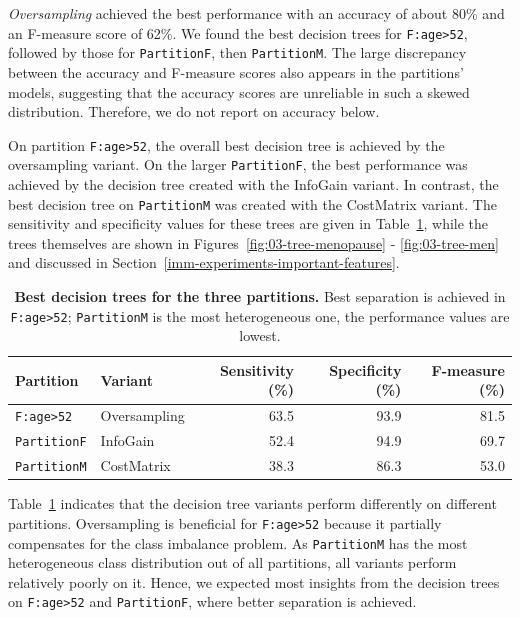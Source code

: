 \documentclass[
  oneside]{book}
\begin{document}
\emph{Oversampling} achieved the best performance with an accuracy of about 80\% and an F-measure score of 62\%.
We found the best decision trees for \texttt{F:age\textgreater{}52}, followed by those for \texttt{PartitionF}, then \texttt{PartitionM}.
The large discrepancy between the accuracy and F-measure scores also appears in the partitions' models, suggesting that the accuracy scores are unreliable in such a skewed distribution. Therefore, we do not report on accuracy below.

On partition \texttt{F:age\textgreater{}52}, the overall best decision tree is achieved by the oversampling variant.
On the larger \texttt{PartitionF}, the best performance was achieved by the decision tree created with the InfoGain variant.
In contrast, the best decision tree on \texttt{PartitionM} was created with the CostMatrix variant.
The sensitivity and specificity values for these trees are given in Table~\ref{tab:03-tree-performance-sens-spec}, while the trees themselves are shown in Figures~\ref{fig:03-tree-menopause} - \ref{fig:03-tree-men} and discussed in Section~\ref{imm-experiments-important-features}.



\begin{table}

\caption{\label{tab:03-tree-performance-sens-spec}\textbf{Best decision trees for the three partitions.} Best separation is achieved in \texttt{F:age\textgreater{}52}; \texttt{PartitionM} is the most heterogeneous one, the performance values are lowest.}
\centering
\begin{tabular}[t]{llrrr}
\toprule
\textbf{Partition} & \textbf{Variant} & \textbf{Sensitivity (\%)} & \textbf{Specificity (\%)} & \textbf{F-measure (\%)}\\
\midrule
\texttt{F:age>52} & Oversampling & 63.5 & 93.9 & 81.5\\
\texttt{PartitionF} & InfoGain & 52.4 & 94.9 & 69.7\\
\texttt{PartitionM} & CostMatrix & 38.3 & 86.3 & 53.0\\
\bottomrule
\end{tabular}
\end{table}

Table~\ref{tab:03-tree-performance-sens-spec} indicates that the decision tree variants perform differently on different partitions.
Oversampling is beneficial for \texttt{F:age\textgreater{}52} because it partially compensates for the class imbalance problem.
As \texttt{PartitionM} has the most heterogeneous class distribution out of all partitions, all variants perform relatively poorly on it.
Hence, we expected most insights from the decision trees on \texttt{F:age\textgreater{}52} and \texttt{PartitionF}, where better separation is achieved.
\end{document}
